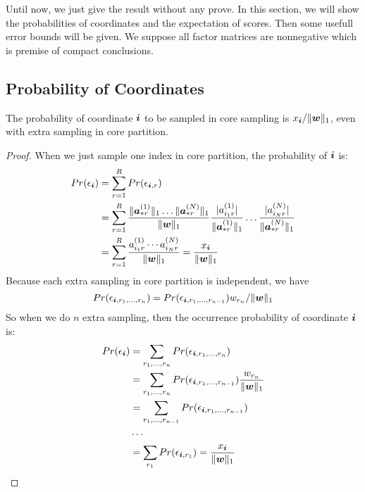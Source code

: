 \documentclass[letterpaper]{article}
\newcommand{\Sca}[3]{{#1}^{(#2)}_{i_#2#3}}%
\newcommand{\V}[1]{{\bm{{\MakeLowercase{#1}}}}}
\newcommand{\VnC}[3]{\V{#1}^{(#2)}_{#3}}
\newcommand{\Nrocl}[2]{\norm{\VnC{a}{#1}{*#2}}{1}}
\newcommand{\norm}[2]{\|#1\|_{#2}}
\newcommand{\WreightR}{\Nrocl{1}{r}\ldots\Nrocl{N}{r}}
\begin{document}
Until now, we just give the result without any prove.
In this section, we will show the probabilities of coordinates and the expectation of scores.
Then some usefull error bounds will be given.
We suppose all factor matrices are nonnegative which is premise of compact conclusions.

\subsection{Probability of Coordinates}

The probability of coordinate $\V{i}$ to be sampled in core sampling is
$x_{\V{i}}/\norm{\V{w}}{1}$, even with extra sampling in core partition.

\begin{proof}
When we just sample one index in core partition, the probability of $\V{i}$ is:
\begin{align*}
Pr(\epsilon_{\V{i}}) 
& = \sum_{r=1}^{R} Pr(\epsilon_{\V{i},r}) \\
& = \sum_{r=1}^{R} \frac{\WreightR}{\norm{\V{W}}{1}}
    \frac{|\Sca{a}{1}{r}|}{\Nrocl{1}{r}}\ldots\frac{|\Sca{a}{N}{r}|}{\Nrocl{N}{r}}\\
& = \sum_{r=1}^{R} \frac{\Sca{a}{1}{r}\cdots\Sca{a}{N}{r}}{\norm{\V{W}}{1}} 
  = \frac{x_{\V{i}}}{\norm{\V{w}}{1}}
\end{align*}
Because each extra sampling in core partition is independent, we have 
\[
    Pr(\epsilon_{\V{i},r_1,\ldots,r_n}) = 
    Pr(\epsilon_{\V{i},r_1,\ldots,r_{n-1}})w_{r_n}/\norm{\V{w}}{1}
\]
So when we do $n$ extra sampling, then the occurrence probability of coordinate $\V{i}$ is:
\begin{align*}
Pr(\epsilon_{\V{i}}) 
&= \sum_{r_1,\ldots,r_n} Pr(\epsilon_{\V{i},r_1,\ldots,r_n})\\
&= \sum_{r_1,\ldots,r_n} Pr(\epsilon_{\V{i},r_1,\ldots,r_{n-1}})
                         \frac{w_{r_n}}{\norm{\V{w}}{1}} \\
&= \sum_{r_1,\ldots,r_{n-1}} Pr(\epsilon_{\V{i},r_1,\ldots,r_{n-1}}) \\
& \cdots\\
&= \sum_{r_1} Pr(\epsilon_{\V{i},r_1})
 = \frac{x_{\V{i}}}{\norm{\V{w}}{1}}
\end{align*}
\end{proof}
\end{document}
